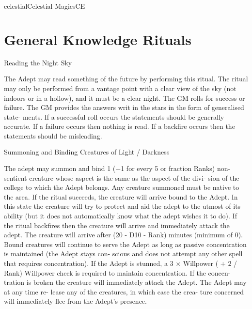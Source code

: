 \begin{College}[1.3]{celestial}{Celestial Magics}{CE}
\section{General Knowledge Rituals}

\begin{ritual}[Q-1]{Reading the Night Sky }

\begin{effects}
 The  Adept  may  read  something  of  the 
future  by  performing  this  ritual.  The  ritual  may 
only  be  performed  from  a  vantage  point  with  a 
clear view  of the sky (not indoors or in a hollow), 
and  it  must  be  a  clear  night.  The  GM  rolls  for 
success  or  failure.  The  GM  provides  the  answers 
writ  in  the  stars  in  the  form  of  generalised  state-
ments.  If  a  successful  roll  occurs  the  statements 
should  be  generally  accurate.  If  a  failure  occurs 
then  nothing  is  read.  If  a  backfire  occurs  then  the 
statements should be misleading. 
\end{effects}
\end{ritual}


\begin{ritual}[Q-2]{Summoning and Binding Creatures of Light / Darkness}

\begin{effects}
The adept may summon and bind 1 (+1 for 
every  5  or  fraction  Ranks)  non-sentient  creature 
whose aspect is the same as the aspect of the divi-
sion  of  the  college  to  which  the  Adept  belongs. 
Any creature summoned must be native to the area. 
If the ritual succeeds, the creature will arrive bound 
to  the  Adept.  In  this  state  the  creature  will  try  to 
protect and aid the adept to the utmost of its ability 
(but it does not automatically know what the adept 
wishes  it  to  do).  If  the  ritual  backfires  then  the 
creature  will  arrive  and  immediately  attack  the 
adept.  The  creature  will  arrive  after  (20  -  D10  - 
Rank)  minutes  (minimum  of  0).  Bound  creatures 
will continue to serve the Adept as long as passive 
concentration  is  maintained  (the  Adept  stays  con-
scious  and  does  not  attempt  any  other  spell  that 
requires concentration). If the Adept is stunned, a 3 
×  Willpower  (  +  2  /  Rank)  Willpower  check  is 
required  to  maintain  concentration.  If  the  concen-
tration  is  broken  the  creature  will  immediately 
attack  the  Adept.  The  Adept  may  at  any  time  re-
lease  any  of  the  creatures,  in  which case  the  crea-
ture  concerned  will  immediately  flee  from  the 
Adept’s presence.  


\end{effects}
\end{ritual}
\end{College}

